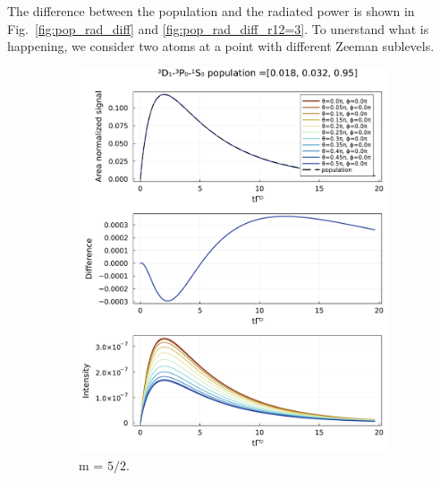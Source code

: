 \documentclass{article}
\begin{document}
The difference between the population and the radiated power is shown in Fig.~\ref{fig:pop_rad_diff} and \ref{fig:pop_rad_diff_r12=3}. To unerstand what is happening, we consider two atoms at a point with different Zeeman sublevels.

\begin{figure}
    \centering
    \begin{subfigure}[b]{.49\textwidth}
        \includegraphics[width=\textwidth]{[4]|F_i=2.5,1.5,1.5,0.5|displacement=0.0,0.0,0.0|exc_frac=0.018,0.032|m_exc=2.5.jld2_int-pop.pdf}
        \caption{m = $5/2$.}
    \end{subfigure}
    \begin{subfigure}[b]{.49\textwidth}

\end{subfigure}
\end{figure}
\end{document}

